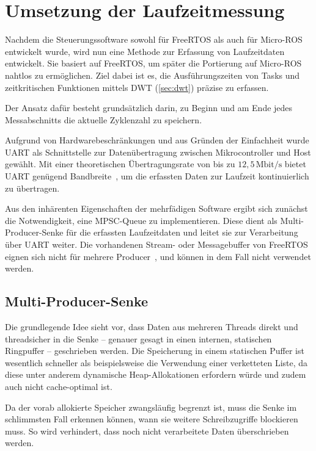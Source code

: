 \section{Umsetzung der Laufzeitmessung}

Nachdem die Steuerungssoftware sowohl für FreeRTOS als auch für Micro-ROS
entwickelt wurde, wird nun eine Methode zur Erfassung von Laufzeitdaten
entwickelt. Sie basiert auf FreeRTOS, um später die Portierung auf Micro-ROS
nahtlos zu ermöglichen. Ziel dabei ist es, die Ausführungszeiten von Tasks und
zeitkritischen Funktionen mittels DWT (\ref{sec:dwt}) präzise zu erfassen.

Der Ansatz dafür besteht grundsätzlich darin, zu Beginn und am Ende jedes
Messabschnitts die aktuelle Zyklenzahl zu speichern.

Aufgrund von Hardwarebeschränkungen und aus Gründen der Einfachheit wurde UART
als Schnittstelle zur Datenübertragung zwischen Mikrocontroller und Host
gewählt. Mit einer theoretischen Übertragungsrate von bis zu
$12,5\,\text{Mbit/s}$ bietet UART genügend Bandbreite~\cite[S.
2]{stm32_datasheet}, um die erfassten Daten zur Laufzeit kontinuierlich zu
übertragen.

Aus den inhärenten Eigenschaften der mehrfädigen Software ergibt sich zunächst
die Notwendigkeit, eine \ac{MPSC}-Queue zu implementieren. Diese dient als
Multi-Producer-Senke für die erfassten Laufzeitdaten und leitet sie zur
Verarbeitung über UART weiter. Die vorhandenen Stream- oder Messagebuffer von
FreeRTOS eignen sich nicht für mehrere Producer~\cite{FreeRTOSStreamBuffer}, und
können in dem Fall nicht verwendet werden.

\subsection{Multi-Producer-Senke}

Die grundlegende Idee sieht vor, dass Daten aus mehreren Threads direkt und
threadsicher in die Senke -- genauer gesagt in einen internen, statischen
Ringpuffer -- geschrieben werden. Die Speicherung in einem statischen Puffer ist
wesentlich schneller als beispielsweise die Verwendung einer verketteten Liste,
da diese unter anderem dynamische Heap-Allokationen erfordern würde und zudem
auch nicht cache-optimal ist.

Da der vorab allokierte Speicher zwangsläufig begrenzt ist, muss die Senke im
schlimmsten Fall erkennen können, wann sie weitere Schreibzugriffe blockieren
muss. So wird verhindert, dass noch nicht verarbeitete Daten überschrieben
werden.

